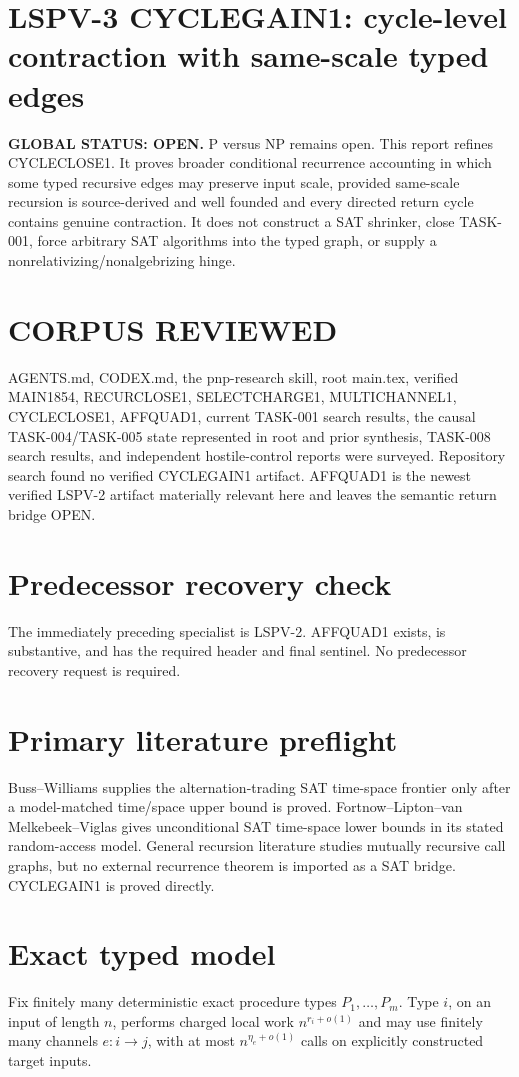 \documentclass[11pt]{article}
\begin{document}
\section*{LSPV-3 CYCLEGAIN1: cycle-level contraction with same-scale typed edges}
\textbf{GLOBAL STATUS: OPEN.} P versus NP remains open. This report refines CYCLECLOSE1. It proves broader conditional recurrence accounting in which some typed recursive edges may preserve input scale, provided same-scale recursion is source-derived and well founded and every directed return cycle contains genuine contraction. It does not construct a SAT shrinker, close TASK-001, force arbitrary SAT algorithms into the typed graph, or supply a nonrelativizing/nonalgebrizing hinge.

\section*{CORPUS REVIEWED}
AGENTS.md, CODEX.md, the pnp-research skill, root main.tex, verified MAIN1854, RECURCLOSE1, SELECTCHARGE1, MULTICHANNEL1, CYCLECLOSE1, AFFQUAD1, current TASK-001 search results, the causal TASK-004/TASK-005 state represented in root and prior synthesis, TASK-008 search results, and independent hostile-control reports were surveyed. Repository search found no verified CYCLEGAIN1 artifact. AFFQUAD1 is the newest verified LSPV-2 artifact materially relevant here and leaves the semantic return bridge OPEN.

\section*{Predecessor recovery check}
The immediately preceding specialist is LSPV-2. AFFQUAD1 exists, is substantive, and has the required header and final sentinel. No predecessor recovery request is required.

\section*{Primary literature preflight}
Buss--Williams supplies the alternation-trading SAT time-space frontier only after a model-matched time/space upper bound is proved. Fortnow--Lipton--van Melkebeek--Viglas gives unconditional SAT time-space lower bounds in its stated random-access model. General recursion literature studies mutually recursive call graphs, but no external recurrence theorem is imported as a SAT bridge. CYCLEGAIN1 is proved directly.

\section*{Exact typed model}
Fix finitely many deterministic exact procedure types \(P_1,\ldots,P_m\). Type \(i\), on an input of length \(n\), performs charged local work \(n^{r_i+o(1)}\) and may use finitely many channels \(e:i\to j\), with at most \(n^{\eta_e+o(1)}\) calls on explicitly constructed target inputs.
\end{document}
